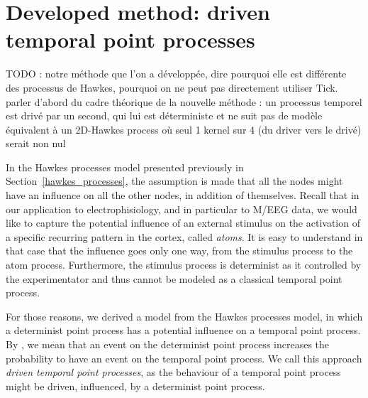 \section{Developed method: driven temporal point processes}\label{developed_method}

TODO : notre méthode que l'on a développée, dire pourquoi elle est différente des processus de Hawkes, pourquoi on ne peut pas directement utiliser Tick.
parler d'abord du cadre théorique de la nouvelle méthode : un processus temporel est drivé par un second, qui lui est déterministe et ne suit pas de modèle
équivalent à un 2D-Hawkes process où seul 1 kernel sur 4 (du driver vers le drivé) serait non nul

In the Hawkes processes model presented previously in Section~\ref{hawkes_processes}, the assumption is made that all the nodes might have an influence on all the other nodes, in addition of themselves.
Recall that in our application to electrophisiology, and in particular to M/EEG data, we would like to capture the potential influence of an external stimulus on the activation of a specific recurring pattern in the cortex, called \textit{atoms}.
It is easy to understand in that case that the influence goes only one way, from the stimulus process to the atom process.
Furthermore, the stimulus process is determinist as it controlled by the experimentator and thus cannot be modeled as a classical temporal point process.

For those reasons, we derived a model from the Hawkes processes model, in which a determinist point process has a potential influence on a temporal point process.
By , we mean that an event on the determinist point process increases the probability to have an event on the temporal point process.
We call this approach \textit{driven temporal point processes}, as the behaviour of a temporal point process might be driven, influenced, by a determinist point process.







